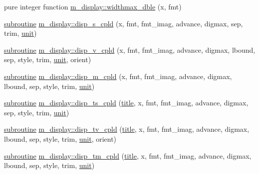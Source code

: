 \begin{DoxyCompactItemize}
\item 
pure integer function \hyperlink{namespacem__display_aed07125464a462f9fa53ed2333846273}{m\+\_\+display\+::widthmax\+\_\+dble} (x, fmt)
\item 
\hyperlink{M__stopwatch_83_8txt_acfbcff50169d691ff02d4a123ed70482}{subroutine} \hyperlink{namespacem__display_ae8bac9197ad0a43b71cd5e43a0a20cec}{m\+\_\+display\+::disp\+\_\+s\+\_\+cpld} (x, fmt, fmt\+\_\+imag, advance, digmax, sep, trim, \hyperlink{M__stopwatch_83_8txt_a5cbef30eb7c0d734bd82f5a7ebea9aa7}{unit})
\item 
\hyperlink{M__stopwatch_83_8txt_acfbcff50169d691ff02d4a123ed70482}{subroutine} \hyperlink{namespacem__display_a4934b217ec0cb576fd840b46b8a7dba2}{m\+\_\+display\+::disp\+\_\+v\+\_\+cpld} (x, fmt, fmt\+\_\+imag, advance, digmax, lbound, sep, style, trim, \hyperlink{M__stopwatch_83_8txt_a5cbef30eb7c0d734bd82f5a7ebea9aa7}{unit}, orient)
\item 
\hyperlink{M__stopwatch_83_8txt_acfbcff50169d691ff02d4a123ed70482}{subroutine} \hyperlink{namespacem__display_a0d50709ce2ad1894b93d80086584059a}{m\+\_\+display\+::disp\+\_\+m\+\_\+cpld} (x, fmt, fmt\+\_\+imag, advance, digmax, lbound, sep, style, trim, \hyperlink{M__stopwatch_83_8txt_a5cbef30eb7c0d734bd82f5a7ebea9aa7}{unit})
\item 
\hyperlink{M__stopwatch_83_8txt_acfbcff50169d691ff02d4a123ed70482}{subroutine} \hyperlink{namespacem__display_a24143f6afc313e16d2a8961067ec9019}{m\+\_\+display\+::disp\+\_\+ts\+\_\+cpld} (\hyperlink{print__watch_83_8txt_a15b5bd21156bb9fca6a755ab8c029a9c}{title}, x, fmt, fmt\+\_\+imag, advance, digmax, sep, style, trim, \hyperlink{M__stopwatch_83_8txt_a5cbef30eb7c0d734bd82f5a7ebea9aa7}{unit})
\item 
\hyperlink{M__stopwatch_83_8txt_acfbcff50169d691ff02d4a123ed70482}{subroutine} \hyperlink{namespacem__display_a72a8a9d86a421f827f6c5d499f5f50b2}{m\+\_\+display\+::disp\+\_\+tv\+\_\+cpld} (\hyperlink{print__watch_83_8txt_a15b5bd21156bb9fca6a755ab8c029a9c}{title}, x, fmt, fmt\+\_\+imag, advance, digmax, lbound, sep, style, trim, \hyperlink{M__stopwatch_83_8txt_a5cbef30eb7c0d734bd82f5a7ebea9aa7}{unit}, orient)
\item 
\hyperlink{M__stopwatch_83_8txt_acfbcff50169d691ff02d4a123ed70482}{subroutine} \hyperlink{namespacem__display_a3970deee1f608f73e9fd13b17b946088}{m\+\_\+display\+::disp\+\_\+tm\+\_\+cpld} (\hyperlink{print__watch_83_8txt_a15b5bd21156bb9fca6a755ab8c029a9c}{title}, x, fmt, fmt\+\_\+imag, advance, digmax, lbound, sep, style, trim, \hyperlink{M__stopwatch_83_8txt_a5cbef30eb7c0d734bd82f5a7ebea9aa7}{unit})

\end{DoxyCompactItemize}
